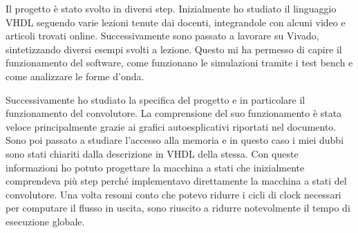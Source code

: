 Il progetto è stato svolto in diversi step. Inizialmente ho studiato il linguaggio VHDL seguendo varie lezioni tenute dai docenti, integrandole con alcuni video e articoli trovati online. Successivamente sono passato a lavorare su Vivado, sintetizzando diversi esempi svolti a lezione. Questo mi ha permesso di capire il funzionamento del software, come funzionano le simulazioni tramite i test bench e come analizzare le forme d'onda.

Successivamente ho studiato la specifica del progetto e in particolare il funzionamento del convolutore. La comprensione del suo funzionamento è stata veloce principalmente grazie ai grafici autoesplicativi riportati nel documento. Sono poi passato a studiare l'accesso alla memoria e in questo caso i miei dubbi sono stati chiariti dalla descrizione in VHDL della stessa. Con queste informazioni ho potuto progettare la macchina a stati che inizialmente comprendeva più step perché implementavo direttamente la macchina a stati del convolutore. Una volta resomi conto che potevo ridurre i cicli di clock necessari per computare il flusso in uscita, sono riuscito a ridurre notevolmente il tempo di esecuzione globale.
